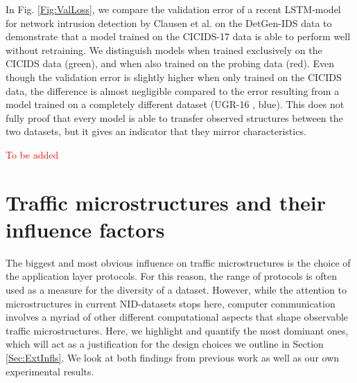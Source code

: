 \documentclass[runningheads]{llncs}
\begin{document}
In Fig. \ref{Fig:ValLoss}, we compare the validation error of a recent LSTM-model for network intrusion detection by Clausen et al. \cite{henryLSTM} on the DetGen-IDS data to demonstrate that a model trained on the CICIDS-17 data is able to perform well without retraining. We distinguish models when trained exclusively on the CICIDS data (green), and when also trained on the probing data (red). 
Even though the validation error is slightly higher when only trained on the CICIDS data, the difference is almost negligible compared to the error resulting from a model trained on a completely different dataset (UGR-16 \cite{macia2018ugr}, blue). This does not fully proof that every model is able to transfer observed structures between the two datasets, but it gives an indicator that they mirror characteristics.




\textcolor{red}{To be added}




\section{Traffic microstructures and their influence factors}\label{Sec:DetGenMicro}

The biggest and most obvious influence on traffic microstructures is the choice of the application layer protocols. For this reason, the range of protocols is often used as a measure for the diversity of a dataset. However, while the attention to microstructures in current NID-datasets stops here, computer communication involves a myriad of other different computational aspects that shape observable traffic microstructures. Here, we highlight and quantify the most dominant ones, which will act as a justification for the design choices we outline in Section \ref{Sec:ExtInfls}. We look at both findings from previous work as well as our own experimental results.
\end{document}
